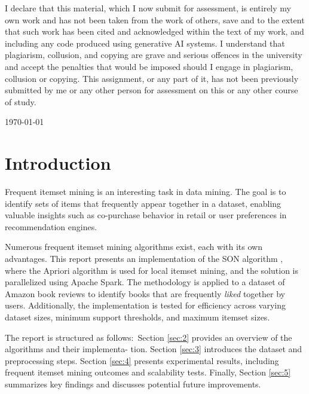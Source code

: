 \documentclass{Class/julia}
\begin{document}
\begin{titlepage}
\begin{center}
\begin{figure}[h!]
\end{figure}
\end{center}
\vfill
\begin{center}
{\small{I declare that this material, which I now submit for assessment, is entirely my own work and has not been taken from the work of others, save and to the extent that such work has been cited and acknowledged within the text of my work, and including any code produced using generative AI systems. I understand that plagiarism, collusion, and copying are grave and serious offences in the university and accept the penalties that would be imposed should I engage in plagiarism, collusion or copying. This assignment, or any part of it, has not been previously submitted by me or any other person for assessment on this or any other course of study.}}
\end{center}
\vfill
    {\large \today \par}
    \vfill
\end{titlepage}

\tableofcontents

\section{Introduction}

Frequent itemset mining is an interesting task in data mining. The goal is to identify sets of items that frequently appear together in a dataset, enabling valuable insights such as co-purchase behavior in retail or user preferences in recommendation engines.

Numerous frequent itemset mining algorithms exist, each with its own advantages. This report presents an implementation of the SON algorithm \citep{savasere1995efficient}, where the Apriori algorithm \citep{agrawal1994fast} is used for local itemset mining, and the solution is parallelized using Apache Spark. The methodology is applied to a dataset of Amazon book reviews \citep{amazon_books_reviews} to identify books that are frequently \textit{liked} together by users. Additionally, the implementation is tested for efficiency across varying dataset sizes, minimum support thresholds, and maximum itemset sizes.

The report is structured as follows:\ Section \ref{sec:2} provides an overview of the algorithms and their implementa- tion. Section \ref{sec:3} introduces the dataset and preprocessing steps. Section \ref{sec:4} presents experimental results, including frequent itemset mining outcomes and scalability tests. Finally, Section \ref{sec:5} summarizes key findings and discusses potential future improvements.
\end{document}

